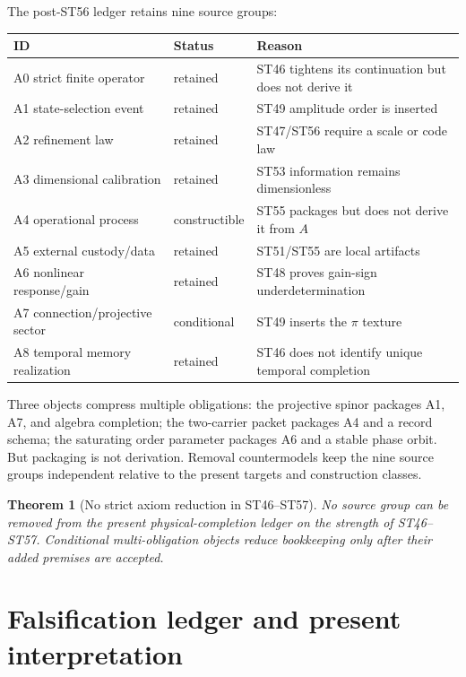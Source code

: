 \documentclass[11pt,a4paper]{article}
\newtheorem{theorem}{Theorem}[section]
\begin{document}
The post-ST56 ledger retains nine source groups:
\begin{center}
\small
\begin{tabularx}{0.96\textwidth}{@{}l l X@{}}
\toprule
ID & Status & Reason\\
\midrule
A0 strict finite operator & retained & ST46 tightens its continuation but does not derive it\\
A1 state-selection event & retained & ST49 amplitude order is inserted\\
A2 refinement law & retained & ST47/ST56 require a scale or code law\\
A3 dimensional calibration & retained & ST53 information remains dimensionless\\
A4 operational process & constructible & ST55 packages but does not derive it from $A$\\
A5 external custody/data & retained & ST51/ST55 are local artifacts\\
A6 nonlinear response/gain & retained & ST48 proves gain-sign underdetermination\\
A7 connection/projective sector & conditional & ST49 inserts the $\pi$ texture\\
A8 temporal memory realization & retained & ST46 does not identify unique temporal completion\\
\bottomrule
\end{tabularx}
\end{center}

Three objects compress multiple obligations: the projective spinor packages A1, A7, and algebra completion; the two-carrier packet packages A4 and a record schema; the saturating order parameter packages A6 and a stable phase orbit. But packaging is not derivation. Removal countermodels keep the nine source groups independent relative to the present targets and construction classes.

\begin{theorem}[No strict axiom reduction in ST46--ST57]
No source group can be removed from the present physical-completion ledger on the strength of ST46--ST57. Conditional multi-obligation objects reduce bookkeeping only after their added premises are accepted.
\end{theorem}

\section{Falsification ledger and present interpretation}
\end{document}
